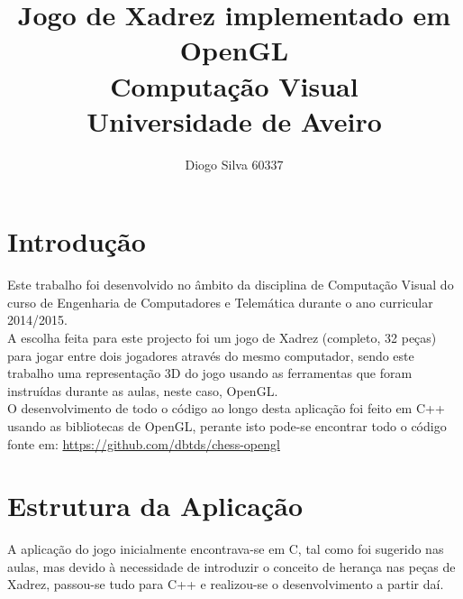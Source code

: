 \documentclass[11pt,a4paper]{report}
\begin{document}
\title{\textbf{Jogo de Xadrez implementado em OpenGL} \\ Computação Visual\\Universidade de Aveiro}
\author{Diogo Silva 60337}
\maketitle

\tableofcontents


\chapter{Introdução}

Este trabalho foi desenvolvido no âmbito da disciplina de Computação Visual do curso de Engenharia de Computadores e Telemática durante o ano curricular 2014/2015.\\

A escolha feita para este projecto foi um jogo de Xadrez (completo, 32 peças) para jogar entre dois jogadores através do mesmo computador, sendo este trabalho uma representação 3D do jogo usando as ferramentas que foram instruídas durante as aulas, neste caso, OpenGL.\\

O desenvolvimento de todo o código ao longo desta aplicação foi feito em C++ usando as bibliotecas de OpenGL, perante isto pode-se encontrar todo o código fonte em: \url{https://github.com/dbtds/chess-opengl}

\chapter{Estrutura da Aplicação}

A aplicação do jogo inicialmente encontrava-se em C, tal como foi sugerido nas aulas, mas devido à necessidade de introduzir o conceito de herança nas peças de Xadrez, passou-se tudo para C++ e realizou-se o desenvolvimento a partir daí.\\
\end{document}
